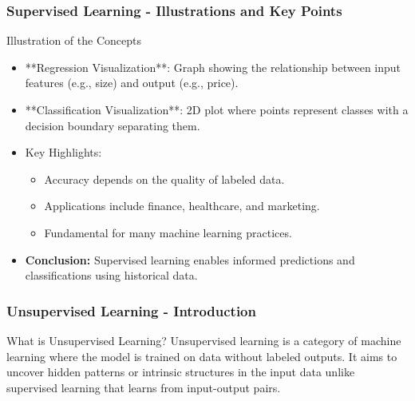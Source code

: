 \documentclass[aspectratio=169]{beamer}
\begin{document}
\begin{frame}[fragile]
  \frametitle{Supervised Learning - Illustrations and Key Points}
  \begin{block}{Illustration of the Concepts}
    \begin{itemize}
      \item **Regression Visualization**: Graph showing the relationship between input features (e.g., size) and output (e.g., price).
      \item **Classification Visualization**: 2D plot where points represent classes with a decision boundary separating them.
    \end{itemize}
  \end{block}
  
  \begin{itemize}
    \item Key Highlights:
      \begin{itemize}
        \item Accuracy depends on the quality of labeled data.
        \item Applications include finance, healthcare, and marketing.
        \item Fundamental for many machine learning practices.
      \end{itemize}
    \item \textbf{Conclusion:} Supervised learning enables informed predictions and classifications using historical data.
  \end{itemize}
\end{frame}

\begin{frame}[fragile]
    \frametitle{Unsupervised Learning - Introduction}
    \begin{block}{What is Unsupervised Learning?}
        Unsupervised learning is a category of machine learning where the model is trained on data without labeled outputs. 
        It aims to uncover hidden patterns or intrinsic structures in the input data unlike supervised learning that learns from input-output pairs.
    \end{block}
\end{frame}
\end{document}
